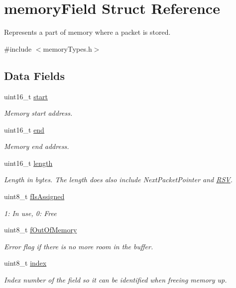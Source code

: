 \hypertarget{structmemory_field}{}\section{memory\+Field Struct Reference}
\label{structmemory_field}


Represents a part of memory where a packet is stored.  




{\ttfamily \#include $<$memory\+Types.\+h$>$}

\subsection*{Data Fields}
\begin{DoxyCompactItemize}
\item 
uint16\+\_\+t \mbox{\hyperlink{structmemory_field_a171a2b5d11b1a5891c38a98ac731a161}{start}}
\begin{DoxyCompactList}\small\item\em Memory start address. \end{DoxyCompactList}\item 
uint16\+\_\+t \mbox{\hyperlink{structmemory_field_afbcd798d035e37e733b567c2b0cb96dc}{end}}
\begin{DoxyCompactList}\small\item\em Memory end address. \end{DoxyCompactList}\item 
uint16\+\_\+t \mbox{\hyperlink{structmemory_field_a1892eba2086d12ac2b09005aeb09ea3b}{length}}
\begin{DoxyCompactList}\small\item\em Length in bytes. The length does also include Next\+Packet\+Pointer and \mbox{\hyperlink{struct_r_s_v}{R\+SV}}. \end{DoxyCompactList}\item 
uint8\+\_\+t \mbox{\hyperlink{structmemory_field_a36ed4d8e7e2e5f308044e7b422a80028}{f\+Is\+Assigned}}
\begin{DoxyCompactList}\small\item\em 1\+: In use, 0\+: Free \end{DoxyCompactList}\item 
uint8\+\_\+t \mbox{\hyperlink{structmemory_field_a90bc80d5fb22db8fba7b5601b9336395}{f\+Out\+Of\+Memory}}
\begin{DoxyCompactList}\small\item\em Error flag if there is no more room in the buffer. \end{DoxyCompactList}\item 
uint8\+\_\+t \mbox{\hyperlink{structmemory_field_aae5a12e607d0f782506d9e6ec6179c64}{index}}
\begin{DoxyCompactList}\small\item\em Index number of the field so it can be identified when freeing memory up. \end{DoxyCompactList}\end{DoxyCompactItemize}


